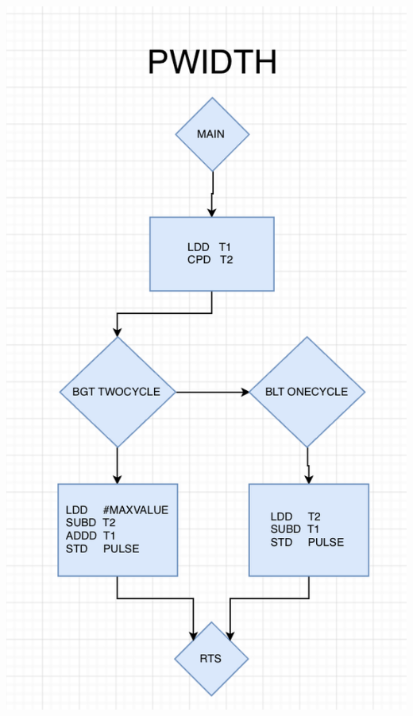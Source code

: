 \documentclass[12pt]{report}
\begin{document}
\begin{center}
     \includegraphics[scale=0.66]{pwidth.PNG}
     \newpage{}

\end{center}
\end{document}
